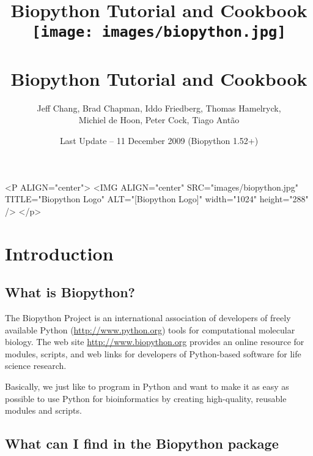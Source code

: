 \documentclass{report}
\begin{document}
\begin{htmlonly}
\title{Biopython Tutorial and Cookbook}
\end{htmlonly}
\begin{latexonly}
\title{
\texttt{[image: images/biopython.jpg]}\\
~\\
Biopython Tutorial and Cookbook}
\end{latexonly}

\author{Jeff Chang, Brad Chapman, Iddo Friedberg, Thomas Hamelryck, \\
Michiel de Hoon, Peter Cock, Tiago Ant\~ao}
\date{Last Update -- 11 December 2009 (Biopython 1.52+)}

\begin{rawhtml}
<P ALIGN="center">
<IMG ALIGN="center" SRC="images/biopython.jpg" TITLE="Biopython Logo" ALT="[Biopython Logo]" width="1024" height="288" />
</p>
\end{rawhtml}

\maketitle
\tableofcontents

\chapter{Introduction}
\label{chapter:introduction}

\section{What is Biopython?}

The Biopython Project is an international association of developers of freely available Python (\url{http://www.python.org}) tools for computational molecular biology. The web site \url{http://www.biopython.org} provides an online resource for modules, scripts, and web links for developers of Python-based software for life science research.

Basically, we just like to program in Python and want to make it as easy as possible to use Python for bioinformatics by creating high-quality, reusable modules and scripts.

\section{What can I find in the Biopython package}
\end{document}
